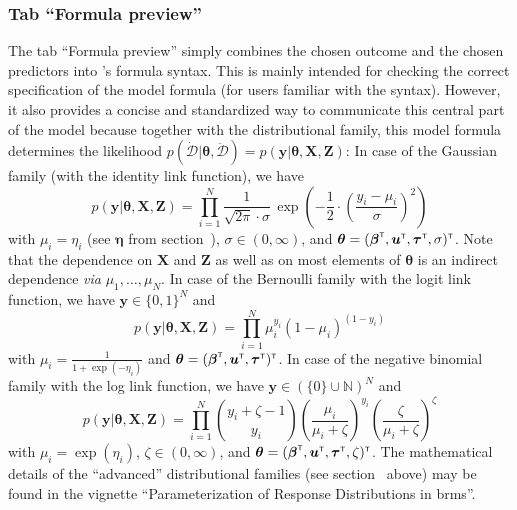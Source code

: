 \subsubsection[Tab "Formula preview"]{Tab ``Formula preview''}
\label{tab-formula}

The tab ``Formula preview'' simply combines the chosen outcome and the
chosen predictors into 's formula syntax. This is mainly intended
for checking the correct specification of the model formula (for users
familiar with the syntax). However, it also provides a concise and standardized
way to communicate this central part of the model because together with the
distributional family, this model formula determines the likelihood
$p(\boldsymbol{\dot{\mathcal{D}}} | \boldsymbol{\theta}, \boldsymbol{\ddot{\mathcal{D}}})
= p(\boldsymbol{y} | \boldsymbol{\theta}, \boldsymbol{X}, \boldsymbol{Z})$:
In case of the Gaussian family (with the identity link function), we have
\begin{equation}
p(\boldsymbol{y} | \boldsymbol{\theta}, \boldsymbol{X}, \boldsymbol{Z}) =
\prod_{i = 1}^{N} \frac{1}{\sqrt{2 \pi} \cdot \sigma}
\,\exp\!\left(-\frac{1}{2} \cdot \left(\frac{y_i - \mu_i}{\sigma}\right)^2\right)
  \label{eqn:gauss}
\end{equation}
with $\mu_i = \eta_i$ (see $\boldsymbol{\eta}$ from section~),
$\sigma \in (0, \infty)$, and
$\boldsymbol{\theta} = (\boldsymbol{\beta}^{\scriptscriptstyle \mathsf{T}}, \boldsymbol{u}^{\scriptscriptstyle \mathsf{T}},
\boldsymbol{\tau}^{\scriptscriptstyle \mathsf{T}}, \sigma)^{\scriptscriptstyle \mathsf{T}}$.
Note that the dependence on $\boldsymbol{X}$ and $\boldsymbol{Z}$ as well as on
most elements of $\boldsymbol{\theta}$ is an indirect dependence \textit{via}
$\mu_1, \dotsc, \mu_N$.
In case of the Bernoulli family with the logit link function, we have
$\boldsymbol{y} \in \{0, 1\}^N$ and
\begin{equation}
p(\boldsymbol{y} | \boldsymbol{\theta}, \boldsymbol{X}, \boldsymbol{Z}) =
\prod_{i = 1}^{N} \mu_i^{y_i} (1 - \mu_i)^{(1 - y_i)}
  \label{eqn:bernoulli}
\end{equation}
with $\mu_i = \frac{1}{1 + \exp(-\eta_i)}$ and $\boldsymbol{\theta} =
(\boldsymbol{\beta}^{\scriptscriptstyle \mathsf{T}}, \boldsymbol{u}^{\scriptscriptstyle \mathsf{T}}, \boldsymbol{\tau}^{\scriptscriptstyle \mathsf{T}})^{\scriptscriptstyle \mathsf{T}}$.
In case of the negative binomial family with the log link function, we have
$\boldsymbol{y} \in \left(\{0\} \cup \mathbb{N}\right)^N$ and
\begin{equation}
p(\boldsymbol{y} | \boldsymbol{\theta}, \boldsymbol{X}, \boldsymbol{Z}) =
\prod_{i = 1}^{N} \binom{y_i + \zeta - 1}{y_i}
\left(\frac{\mu_i}{\mu_i + \zeta}\right)^{y_i}
\left(\frac{\zeta}{\mu_i + \zeta}\right)^{\zeta}
  \label{eqn:negbinom}
\end{equation}
with $\mu_i = \exp(\eta_i)$, $\zeta \in (0, \infty)$, and
$\boldsymbol{\theta} = (\boldsymbol{\beta}^{\scriptscriptstyle \mathsf{T}},
\boldsymbol{u}^{\scriptscriptstyle \mathsf{T}}, \boldsymbol{\tau}^{\scriptscriptstyle \mathsf{T}}, \zeta)^{\scriptscriptstyle \mathsf{T}}$.
The mathematical details of the ``advanced'' distributional families (see
section~ above) may be found in the  vignette
``Parameterization of Response Distributions in brms''.

